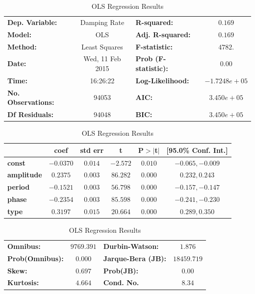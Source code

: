 \documentclass[11pt, letterpaper]{article}
\begin{document}
\begin{table}
\begin{center}
\begin{tabular}{lclc}
\toprule
\textbf{Dep. Variable:}    &      Damping Rate       & \textbf{  R-squared:         } &$     0.169  $\\
\textbf{Model:}            &       OLS        & \textbf{  Adj. R-squared:    } &$     0.169  $\\
\textbf{Method:}           &  Least Squares   & \textbf{  F-statistic:       } &$     4782.  $\\
\textbf{Date:}             & Wed, 11 Feb 2015 & \textbf{  Prob (F-statistic):} &$     0.00   $\\
\textbf{Time:}             &     16:26:22     & \textbf{  Log-Likelihood:    } &$-1.7248e+05 $\\
\textbf{No. Observations:} &       94053      & \textbf{  AIC:               } &$ 3.450e+05  $\\
\textbf{Df Residuals:}     &       94048      & \textbf{  BIC:               } &$ 3.450e+05  $\\
\bottomrule
\end{tabular}
\begin{tabular}{lccccc}
                   & \textbf{coef} & \textbf{std err} & \textbf{t} & \textbf{P$>$$|$t$|$} & \textbf{[95.0\% Conf. Int.]}  \\
\midrule
\textbf{const}     &     $-0.0370$ &       $0.014$    &   $-2.572$ &        $0.010$       &       $-0.065,  -0.009$      \\
\textbf{amplitude} &     $ 0.2375$ &       $0.003$    &   $86.282$ &        $0.000$       &       $ 0.232,   0.243$      \\
\textbf{period}    &     $-0.1521$ &       $0.003$    &   $56.798$ &        $0.000$       &       $-0.157,  -0.147$      \\
\textbf{phase}     &     $-0.2354$ &       $0.003$    &   $85.598$ &        $0.000$       &       $-0.241,  -0.230$      \\
\textbf{type}      &     $ 0.3197$ &       $0.015$    &   $20.664$ &        $0.000$       &       $ 0.289,   0.350$      \\
\bottomrule
\end{tabular}
\begin{tabular}{lclc}
\textbf{Omnibus:}       &$9769.391$& \textbf{  Durbin-Watson:     } &$    1.876$ \\
\textbf{Prob(Omnibus):} &$  0.000 $& \textbf{  Jarque-Bera (JB):  } &$18459.719$ \\
\textbf{Skew:}          &$  0.697 $& \textbf{  Prob(JB):          } &$     0.00$ \\
\textbf{Kurtosis:}      &$  4.664 $& \textbf{  Cond. No.          } &$     8.34$ \\
\bottomrule
\end{tabular}
\end{center} 
\caption{OLS Regression Results}
\label{tab:ols_reg}
\end{table}
\end{document}

